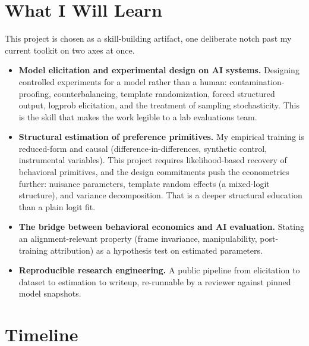 \documentclass[11pt]{article}
\begin{document}
\section{What I Will Learn}

This project is chosen as a skill-building artifact, one deliberate notch past my current toolkit on
two axes at once.

\begin{itemize}
  \item \textbf{Model elicitation and experimental design on AI systems.} Designing controlled
  experiments for a model rather than a human: contamination-proofing, counterbalancing, template
  randomization, forced structured output, logprob elicitation, and the treatment of sampling
  stochasticity. This is the skill that makes the work legible to a lab evaluations team.
  \item \textbf{Structural estimation of preference primitives.} My empirical training is reduced-form
  and causal (difference-in-differences, synthetic control, instrumental variables). This project
  requires likelihood-based recovery of behavioral primitives, and the design commitments push the
  econometrics further: nuisance parameters, template random effects (a mixed-logit structure), and
  variance decomposition. That is a deeper structural education than a plain logit fit.
  \item \textbf{The bridge between behavioral economics and AI evaluation.} Stating an
  alignment-relevant property (frame invariance, manipulability, post-training attribution) as a
  hypothesis test on estimated parameters.
  \item \textbf{Reproducible research engineering.} A public pipeline from elicitation to dataset to
  estimation to writeup, re-runnable by a reviewer against pinned model snapshots.
\end{itemize}

\section{Timeline}
\end{document}
